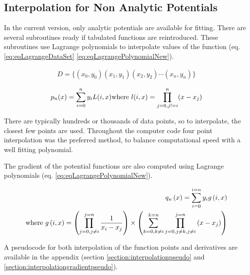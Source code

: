 \subsection{Interpolation for Non Analytic Potentials}

In the current version, only analytic potentials are available for fitting.  There are several subroutines ready if tabulated functions are reintroduced.  These subroutines use Lagrange polynomials to interpolate values of the function (eq. \ref{eq:eqLagrangeDataSet} \ref{eq:eqLagrangePolynomialNew}).

\begin{equation}
\begin{split}
D = \lbrace \left(x_0, y_0 \right) \left(x_1, y_1 \right) \left(x_2, y_2 \right) \dotsm \left(x_n, y_n \right) \rbrace
\end{split}
\label{eq:eqLagrangeDataSet}
\end{equation}

\begin{equation}
\begin{split}
p_n (x) = \sum _{i=0} ^n y_i L(i, x) 
\textnormal{where    } l(i, x) = \prod _{j=0 , j!=i} ^n (x - x_j)
\end{split}
\label{eq:eqLagrangePolynomialNew}
\end{equation}

There are typically hundreds or thousands of data points, so to interpolate, the closest few points are used.  Throughout the computer code four point interpolation was the preferred method, to balance computational speed with a well fitting polynomial.  

The gradient of the potential functions are also computed using Lagrange polynomials (eq. \ref{eq:eqLagrangePolynomialNew}).

\begin{equation}
\begin{split}
q_n \left( x \right) = \sum_{i=0}^{i=n} y_{i} g \left(i,  x \right) \\
\textnormal{where    } g \left(i, x \right) = \left( \prod_{j=0, j \neq i}^{j=n} \frac{1}{x_i - x_j} \right) \times \left( \sum_{k=0, k \neq i}^{k=n} \prod_{j=0, j \neq k, j \neq i}^{j=n} \left( x - x_j \right) \right)
\end{split}
\label{eq:eqLagrangePolynomialNew}
\end{equation}

A pseudocode for both interpolation of the function points and derivatives are available in the appendix (section \ref{section:interpolationpseudo} and \ref{section:interpolationgradientpseudo}).



